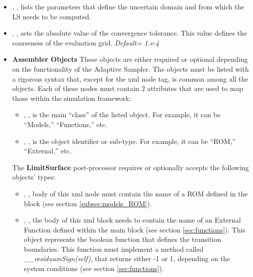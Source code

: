 \begin{itemize}
  \item {}, ,
  lists the parameters that define the uncertain domain and from which the LS
  needs to be computed.
  \item {}, , sets the absolute
  value of the convergence tolerance.
  This value defines the coarseness of the evaluation grid.
  \textit{Default= 1.e-4}
  \item \textbf{Assembler Objects} These objects are either required or optional
  depending on the functionality of the Adaptive Sampler.
  The objects must be listed with a rigorous syntax that, except for the xml
  node tag, is common among all the objects.
  Each of these nodes must contain 2 attributes that are used to map those
  within the simulation framework:
   \begin{itemize}
    \item {}, , is the main
    ``class'' of the listed object.
    For example, it can be ``Models,'' ``Functions,'' etc.
    \item {}, , is the object
    identifier or sub-type.
    For example, it can be ``ROM,'' ``External,'' etc.
  \end{itemize}
  The \textbf{LimitSurface} post-processor requires or optionally accepts the
  following objects' types:
   \begin{itemize}
    \item {}, , body of this xml
    node must contain the name of a ROM defined in the  block
    (see section \ref{subsec:models_ROM}).
    \item {}, , the body of
    this xml block needs to contain the name of an External Function defined
    within the  main block (see section \ref{sec:functions}).
    This object represents the boolean function that defines the transition
    boundaries.
    This function must implement a method called
    \textit{\_\_residuumSign(self)}, that returns either -1 or 1, depending on
    the system conditions (see section \ref{sec:functions}).
    \end{itemize}
\end{itemize}

